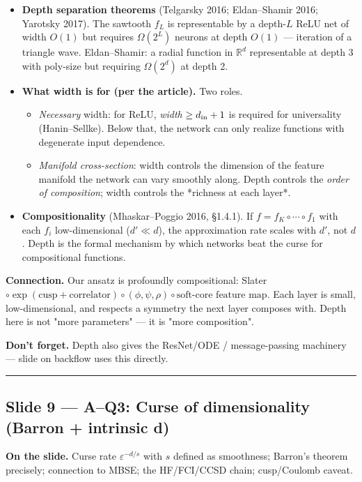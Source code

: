 \documentclass[11pt]{article}
\begin{document}
\begin{itemize}
\begin{itemize}
\end{itemize}
\item \textbf{Depth separation theorems} (Telgarsky 2016; Eldan--Shamir 2016;
Yarotsky 2017). The sawtooth $f_L$ is representable by a depth-$L$ ReLU
net of width $O(1)$ but requires $\Omega(2^L)$ neurons at depth $O(1)$ ---
iteration of a triangle wave. Eldan--Shamir: a radial function in
$\mathbb R^d$ representable at depth 3 with poly-size but requiring
$\Omega(2^d)$ at depth 2.
\item \textbf{What width is for (per the article).} Two roles.
\begin{itemize}
\item \emph{Necessary} width: for ReLU, \emph{width} $\ge d_{\rm in} + 1$ is required
for universality (Hanin--Sellke). Below that, the network can only
realize functions with degenerate input dependence.
\item \emph{Manifold cross-section}: width controls the dimension of the
feature manifold the network can vary smoothly along. Depth controls
the \emph{order of composition}; width controls the *richness at each
layer*.
\end{itemize}
\item \textbf{Compositionality} (Mhaskar--Poggio 2016, \S{}1.4.1). If $f = f_K \circ
  \cdots \circ f_1$ with each $f_i$ low-dimensional ($d' \ll d$), the
approximation rate scales with $d'$, not $d$. Depth is the formal
mechanism by which networks beat the curse for compositional functions.
\end{itemize}
\textbf{Connection.} Our ansatz is profoundly compositional: Slater
$\circ \exp(\text{cusp} + \text{correlator}) \circ (\phi, \psi, \rho) \circ
\text{soft-core feature map}$. Each layer is small, low-dimensional, and
respects a symmetry the next layer composes with. Depth here is not "more
parameters" --- it is "more composition".

\textbf{Don't forget.} Depth also gives the ResNet/ODE / message-passing
machinery --- slide on backflow uses this directly.

\vspace{4pt}\hrule\vspace{8pt}

\subsection*{Slide 9 --- A--Q3: Curse of dimensionality (Barron + intrinsic d)}

\textbf{On the slide.} Curse rate $\varepsilon^{-d/s}$ with $s$ defined as
smoothness; Barron's theorem precisely; connection to MBSE; the
HF/FCI/CCSD chain; cusp/Coulomb caveat.
\end{document}
